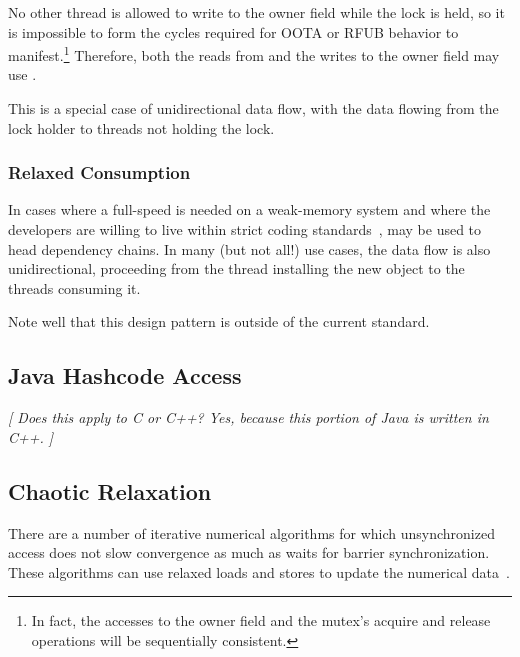 \documentclass[10]{article}
\begin{document}
No other thread is allowed to write to the owner field while the lock
is held, so it is impossible to form the cycles required for OOTA or
RFUB behavior to manifest.\footnote{
	In fact, the accesses to the owner field and the mutex's acquire
	and release operations will be sequentially consistent.}
Therefore, both the reads from and the writes to the owner field
may use .

This is a special case of unidirectional data flow, with the data flowing
from the lock holder to threads not holding the lock.


\subsubsection{Relaxed Consumption}
\label{sec:Relaxed Consumption}

In cases where a full-speed  is needed on a
weak-memory system and where the developers are willing to live within
strict coding standards~\cite{PaulEMcKenney2014rcu-dereference},
 may be used to head dependency chains.
In many (but not all!) use cases, the data flow is also unidirectional,
proceeding from the thread installing the new object to the threads
consuming it.

Note well that this design pattern is outside of the current standard.

\subsection{Java Hashcode Access}
\label{sec:Java Hashcode Access}

\emph{[ Does this apply to C or C++?
Yes, because this portion of Java is written in C++. ]}

\subsection{Chaotic Relaxation}
\label{sec:Chaotic Relaxation}

There are a number of iterative numerical algorithms for which unsynchronized
access does not slow convergence as much as waits for barrier synchronization.
These algorithms can use relaxed loads and stores to update the numerical
data~\cite{Andrews91textbook}.
\end{document}
